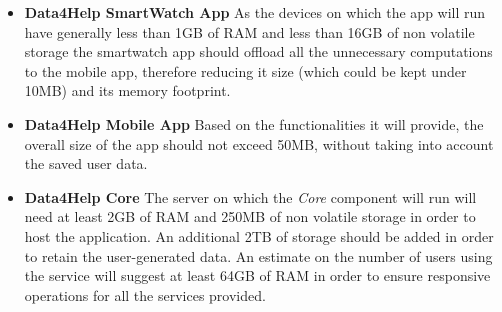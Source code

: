 \begin{itemize}
    \item \textbf{Data4Help SmartWatch App} As the devices on which the app will run have generally less than 1GB of RAM and less than 16GB of non volatile storage the smartwatch app should offload all the unnecessary computations to the mobile app, therefore reducing it size (which could be kept under 10MB) and its memory footprint.
    \item \textbf{Data4Help Mobile App} Based on the functionalities it will provide, the overall size of the app should not exceed 50MB, without taking into account the saved user data.
    \item \textbf{Data4Help Core} The server on which the \textit{Core} component will run will need at least 2GB of RAM and 250MB of non volatile storage in order to host the application. An additional 2TB of storage should be added in order to retain the user-generated data. \newline An estimate on the number of users using the service will suggest at least 64GB of RAM in order to ensure responsive operations for all the services provided.
    
\end{itemize}

